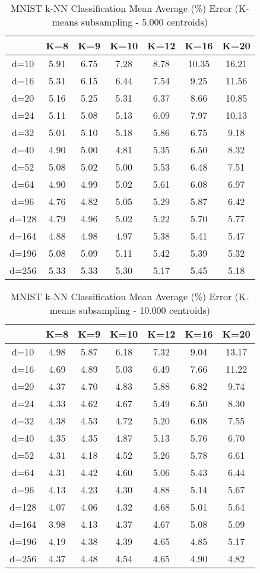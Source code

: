 \begin{table}[H]
\centering
\label{tab:table4}
\begin{tabular}{|c|c|c|c|c|c|c|}
\hline
& K=8 & K=9 & K=10 & K=12 & K=16 & K=20 \\
\hline
d=10 & 5.91 & 6.75 & 7.28 & 8.78 & 10.35 & 16.21 \\
d=16 & 5.31 & 6.15 & 6.44 & 7.54 & 9.25 & 11.56 \\
d=20 & 5.16 & 5.25 & 5.31 & 6.37 & 8.66 & 10.85 \\
d=24 & 5.11 & 5.08 & 5.13 & 6.09 & 7.97 & 10.13 \\
d=32 & 5.01 & 5.10 & 5.18 & 5.86 & 6.75 & 9.18 \\
d=40 & 4.90 & 5.00 & 4.81 & 5.35 & 6.50 & 8.32 \\
d=52 & 5.08 & 5.02 & 5.00 & 5.53 & 6.48 & 7.51 \\
d=64 & 4.90 & 4.99 & 5.02 & 5.61 & 6.08 & 6.97 \\
d=96 & 4.76 & 4.82 & 5.05 & 5.29 & 5.87 & 6.42 \\
d=128 & 4.79 & 4.96 & 5.02 & 5.22 & 5.70 & 5.77 \\
d=164 & 4.88 & 4.98 & 4.97 & 5.38 & 5.41 & 5.47 \\
d=196 & 5.08 & 5.09 & 5.11 & 5.42 & 5.39 & 5.32 \\
d=256 & 5.33 & 5.33 & 5.30 & 5.17 & 5.45 & 5.18 \\
\hline
\end{tabular}
\caption{MNIST k-NN Classification Mean Average (\%) Error (K-means subsampling - 5.000 centroids)}
\end{table}

\begin{table}[H]
\centering
\label{tab:table5}
\begin{tabular}{|c|c|c|c|c|c|c|}
\hline
& K=8 & K=9 & K=10 & K=12 & K=16 & K=20 \\
\hline
d=10 & 4.98 & 5.87 & 6.18 & 7.32 & 9.04 & 13.17 \\
d=16 & 4.69 & 4.89 & 5.03 & 6.49 & 7.66 & 11.22 \\
d=20 & 4.37 & 4.70 & 4.83 & 5.88 & 6.82 & 9.74 \\
d=24 & 4.33 & 4.62 & 4.67 & 5.49 & 6.50 & 8.30 \\
d=32 & 4.38 & 4.53 & 4.72 & 5.20 & 6.08 & 7.55 \\
d=40 & 4.35 & 4.35 & 4.87 & 5.13 & 5.76 & 6.70 \\
d=52 & 4.31 & 4.18 & 4.52 & 5.26 & 5.78 & 6.61 \\
d=64 & 4.31 & 4.42 & 4.60 & 5.06 & 5.43 & 6.44 \\
d=96 & 4.13 & 4.23 & 4.30 & 4.88 & 5.14 & 5.67 \\
d=128 & 4.07 & 4.06 & 4.32 & 4.68 & 5.01 & 5.64 \\
d=164 & 3.98 & 4.13 & 4.37 & 4.67 & 5.08 & 5.09 \\
d=196 & 4.19 & 4.38 & 4.39 & 4.65 & 4.85 & 5.17 \\
d=256 & 4.37 & 4.48 & 4.54 & 4.65 & 4.90 & 4.82 \\
\hline
\end{tabular}
\caption{MNIST k-NN Classification Mean Average (\%) Error (K-means subsampling - 10.000 centroids)}
\end{table}

